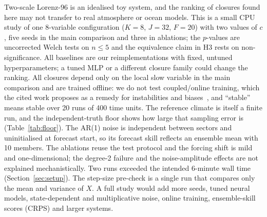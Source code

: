 Two-scale Lorenz-96 is an idealised toy system, and the ranking of closures found here may not transfer to real atmosphere or ocean models. This is a small CPU study of one 8-variable configuration ($K{=}8$, $J{=}32$, $F{=}20$) with two values of $c$, five seeds in the main comparison and three in ablations; the $p$-values are uncorrected Welch tests on $n\le5$ and the equivalence claim in H3 rests on non-significance. All baselines are our reimplementations with fixed, untuned hyperparameters; a tuned MLP or a different closure family could change the ranking. All closures depend only on the local slow variable in the main comparison and are trained offline: we do not test coupled/online training, which the cited work proposes as a remedy for instabilities and biases~\cite{rasp2019coupled}, and ``stable'' means stable over 20 runs of 400 time units. The reference climate is itself a finite run, and the independent-truth floor shows how large that sampling error is (Table~\ref{tab:floor}). The AR(1) noise is independent between sectors and uninitialised at forecast start, so its forecast skill reflects an ensemble mean with 10 members. The ablations reuse the test protocol and the forcing shift is mild and one-dimensional; the degree-2 failure and the noise-amplitude effects are not explained mechanistically. Two runs exceeded the intended 6-minute wall time (Section~\ref{sec:setup}). The step-size pre-check is a single run that compares only the mean and variance of $X$. A full study would add more seeds, tuned neural models, state-dependent and multiplicative noise, online training, ensemble-skill scores (CRPS) and larger systems.
